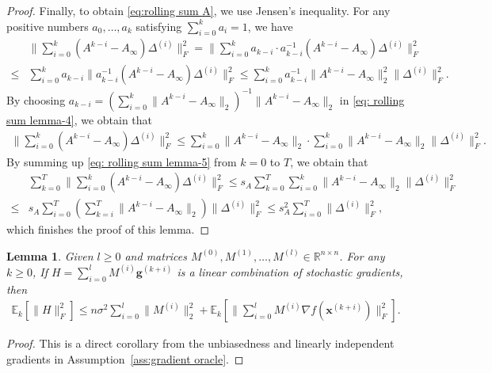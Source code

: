 \documentclass[10pt]{article}
\newcommand{\vg}{{\mathbf{g}}}
\newcommand{\vx}{{\mathbf{x}}}
\newcommand{\EE}{\mathbb{E}}
\newcommand{\norm}[1]{\| #1 \|}
\newtheorem{lemma}[thm]{Lemma}
\begin{document}
\begin{proof}
Finally, to obtain \eqref{eq:rolling sum A}, we use Jensen's inequality. For any positive numbers $a_0,\ldots,a_k$ satisfying $\sum_{i=0}^{k} a_i=1$, we have
\begin{align}\label{eq: rolling sum lemma-4}
     &\norm{\sum_{i=0}^k(A^{k-i}-A_\infty)\Delta^{(i)}}_F^2=\norm{\sum_{i=0}^k a_{k-i}\cdot a_{k-i}^{-1}(A^{k-i}-A_\infty)\Delta^{(i)}}_F^2\\
    \le& \sum_{i=0}^k a_{k-i}\norm{a_{k-i}^{-1}(A^{k-i}-A_\infty)\Delta^{(i)}}_F^2\le \sum_{i=0}^k a_{k-i}^{-1}\norm{A^{k-i}-A_\infty}_2^2\norm{\Delta^{(i)}}_F^2.\nonumber
\end{align}
By choosing $a_{k-i}=(\sum_{i=0}^k\norm{A^{k-i}-A_\infty}_2)^{-1}\norm{A^{k-i}-A_\infty}_2$ in \eqref{eq: rolling sum lemma-4}, we obtain that
\begin{align}\label{eq: rolling sum lemma-5}
    \norm{\sum_{i=0}^k(A^{k-i}-A_\infty)\Delta^{(i)}}_F^2\le \sum_{i=0}^k\norm{A^{k-i}-A_\infty}_2\cdot\sum_{i=0}^k\norm{A^{k-i}-A_\infty}_2\norm{\Delta^{(i)}}_F^2.
\end{align}
By summing up \eqref{eq: rolling sum lemma-5} from $k=0$ to $T$, we obtain that
\begin{align*}
    &\sum_{k=0}^T\norm{\sum_{i=0}^k(A^{k-i}-A_\infty)\Delta^{(i)}}_F^2 \le s_A\sum_{k=0}^T\sum_{i=0}^k\norm{A^{k-i}-A_\infty}_2\norm{\Delta^{(i)}}_F^2\\
    \le& s_A \sum_{i=0}^T\!\left(\sum_{k=i}^T\norm{A^{k-i}-A_\infty}_2\right)\norm{\Delta^{(i)}}_F^2\le s_A^2\sum_{i=0}^T\norm{\Delta^{(i)}}_F^2,
\end{align*}
which finishes the proof of this lemma.
\end{proof}




\begin{lemma}\label{lem:noise separation}
Given $l\ge 0$ and matrices $M^{(0)}, M^{(1)},\ldots, M^{(l)}\in \mathbb{R}^{n\times n}$. For any $k\ge 0$, If $H=\sum_{i=0}^{l} M^{(i)}\vg^{(k+i)}$ is a linear combination of stochastic gradients, then 
\begin{align*}
    \EE_k[\norm{H}_F^2]\le n\sigma^2 \sum_{i=0}^l\norm{M^{(i)}}_2^2+\EE_k[\norm{\sum_{i=0}^{l} M^{(i)}\nabla f(\vx^{(k+i)})}_F^2].
\end{align*}
\end{lemma}
\begin{proof}
    This is a direct corollary from the unbiasedness and linearly independent gradients in Assumption~\ref{ass:gradient oracle}.
\end{proof}
\end{document}
